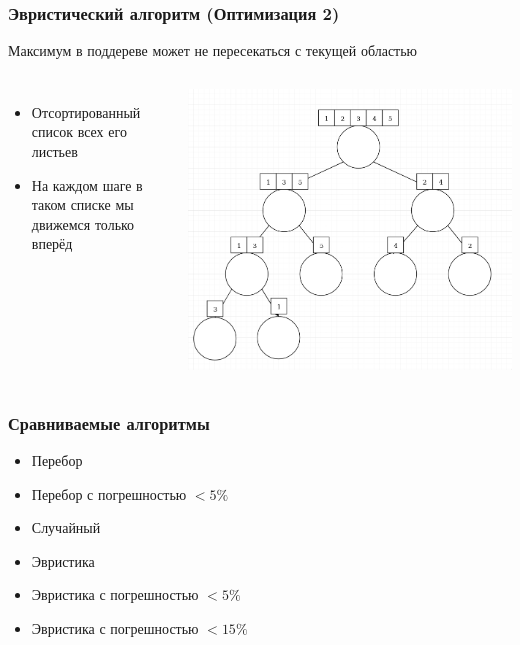 \documentclass{beamer}
\begin{document}
\begin{frame} \frametitle{Эвристический алгоритм (Оптимизация 2)}
    Максимум в поддереве может не пересекаться с текущей областью

    \begin{columns}
            \begin{itemize}
                \item Отсортированный список всех его листьев
                \item На каждом шаге в таком списке мы движемся только вперёд
            \end{itemize}
            \includegraphics[width=1.1\textwidth]{merge.png}
    \end{columns}
\end{frame}

\begin{frame} \frametitle{Сравниваемые алгоритмы}
    \begin{itemize}
        \item Перебор
        \item Перебор с погрешностью $<5\%$
        \item Случайный
        \item Эвристика
        \item Эвристика с погрешностью $<5\%$
        \item Эвристика с погрешностью $<15\%$
    \end{itemize}
\end{frame}
\end{document}
